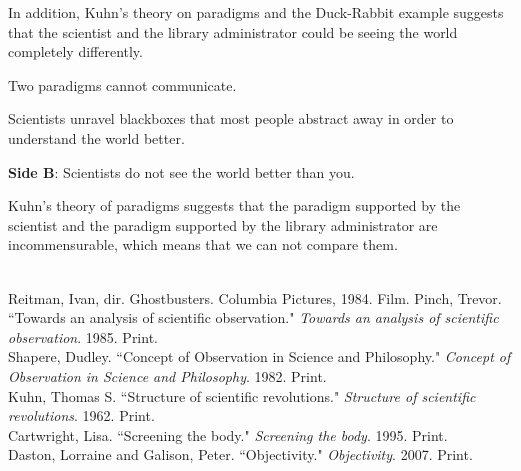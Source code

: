 \documentclass[11pt, oneside]{article}
\begin{document}
\par In addition, Kuhn's theory on paradigms and the Duck-Rabbit example suggests that the scientist and the library administrator could be seeing the world completely differently. 


\par Two paradigms cannot communicate.

\par Scientists unravel blackboxes that most people abstract away in order to understand the world better.

\newpage

\noindent \textbf{Side B}: Scientists do not see the world better than you.


\par Kuhn's theory of paradigms suggests that the paradigm supported by the scientist and the paradigm supported by the library administrator are incommensurable, which means that we can not compare them.


\begin{workscited}
\bibent \\
\bibent Reitman, Ivan, dir. Ghostbusters. Columbia Pictures, 1984. Film.
\bibent Pinch, Trevor. ``Towards an analysis of scientific observation."  \textit{Towards an analysis of scientific observation}.  1985. Print. \\
\bibent Shapere, Dudley. ``Concept of Observation in Science and Philosophy."  \textit{Concept of Observation in Science and Philosophy}.  1982. Print. \\
\bibent Kuhn, Thomas S. ``Structure of scientific revolutions."  \textit{Structure of scientific revolutions}.  1962. Print. \\
\bibent Cartwright, Lisa. ``Screening the body."  \textit{Screening the body}.  1995. Print. \\
\bibent Daston, Lorraine and Galison, Peter. ``Objectivity."  \textit{Objectivity}.  2007. Print. \\
\end{workscited}
\end{document}
